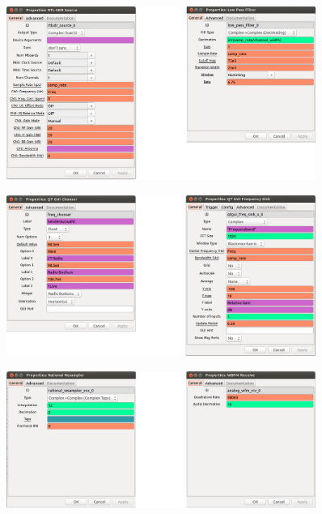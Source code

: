 \documentclass[12pt,a4paper]{article}
\begin{document}
\begin{figure}[hbt!]
\centering
	\includegraphics[width=0.9\textwidth ]
	{Bilder/Aufgabe1-properties1.png}
	\label{fig:Label3}
\end{figure}


\begin{figure}[hbt!]
\centering
	\includegraphics[width=0.9\textwidth ]
	{Bilder/Aufgabe1-properties2.png}
	\label{fig:Label4}
\end{figure}


\begin{figure}[hbt!]
\centering
	\includegraphics[width=0.9\textwidth ]
	{Bilder/Aufgabe1-properties3.png}
	\label{fig:Label5}
\end{figure}
\end{document}
